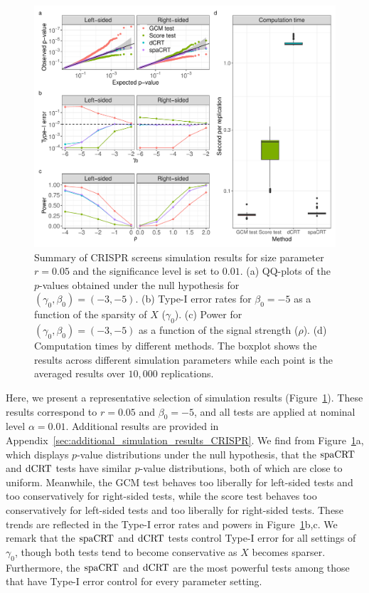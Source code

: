 \documentclass[12pt]{article}
\theoremstyle{definition}
\newcommand{\srx}{X}									%
\newcommand{\dCRT}{\textnormal{dCRT}} 					%
\newcommand{\spacrt}{\textnormal{spaCRT}}               %
\begin{document}
\begin{figure}[!ht]
	\centering
	\includegraphics[width=1.0\textwidth]{figures-and-tables/simulation/NB-regression/summary/simulation-summary.pdf}
	\caption{Summary of CRISPR screens simulation results for size parameter $r = 0.05$ and the significance level is set to $0.01$. (a) QQ-plots of the $p$-values obtained under the null hypothesis for $(\gamma_0, \beta_0) = (-3, -5)$. (b) Type-I error rates for $\beta_0 = -5$ as a function of the sparsity of $\srx$ ($\gamma_0$). (c) Power for $(\gamma_0, \beta_0) = (-3, -5)$ as a function of the signal strength ($\rho$). (d) Computation times by different methods. The boxplot shows the results across different simulation parameters while each point is the averaged results over $10,000$ replications.}
	\label{fig:simulation-summary}
\end{figure}

Here, we present a representative selection of simulation results (Figure~\ref{fig:simulation-summary}). These results correspond to $r = 0.05$ and $\beta_0 = -5$, and all tests are applied at nominal level $\alpha = 0.01$. Additional results are provided in Appendix~\ref{sec:additional_simulation_results_CRISPR}. We find from Figure~\ref{fig:simulation-summary}a, which displays $p$-value distributions under the null hypothesis, that the $\spacrt$ and $\dCRT$ tests have similar $p$-value distributions, both of which are close to uniform. Meanwhile, the GCM test behaves too liberally for left-sided tests and too conservatively for right-sided tests, while the score test behaves too conservatively for left-sided tests and too liberally for right-sided tests. These trends are reflected in the Type-I error rates and powers in Figure~\ref{fig:simulation-summary}b,c. We remark that the $\spacrt$ and $\dCRT$ tests control Type-I error for all settings of $\gamma_0$, though both tests tend to become conservative as $\srx$ becomes sparser. Furthermore, the $\spacrt$ and $\dCRT$ are the most powerful tests among those that have Type-I error control for every parameter setting.
\end{document}
